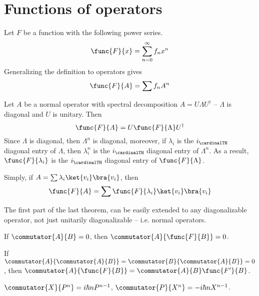 \section{Functions of operators}
Let \(F\) be a function with the following power series. 
\begin{equation*}
    \func{F}{x} = \sum_{n = 0}^{\infty} f_n x^n
\end{equation*}
Generalizing the definition to operators gives 
\begin{equation*}
    \func{F}{A} = \sum f_n A^n
\end{equation*}
\begin{theorem}
    Let \(A\) be a normal operator with spectral decomposition \(A = U \Lambda U^{\dagger}\) -- \(\Lambda\) is diagonal and \(U\) is unitary. Then 
    \begin{equation*}
        \func{F}{A} = U \func{F}{\Lambda} U^{\dagger}
    \end{equation*}
    Since \(\Lambda\) is diagonal, then \(\Lambda^n\) is diagonal, moreover, if \(\lambda_i\) is the \(i_{\cardinalTH}\) diagonal entry of \(\Lambda\), then \(\lambda_i^n\) is the \(i_{\cardinalTH}\) diagonal entry of \(\Lambda^n\). As a result, \(\func{F}{\lambda_i}\) is the \(i_{\cardinalTH}\) diagonal entry of \(\func{F}{\Lambda}\). 
    
    Simply, if \(A = \sum \lambda_i \ket{v_i}\bra{v_i}\), then 
    \begin{equation*}
        \func{F}{A} = \sum \func{F}{\lambda_i} \ket{v_i}\bra{v_i}
    \end{equation*}
\end{theorem}
The first part of the last theorem, can be easily extended to any diagonalizable operator, not just unitarily diagonalizable -- i.e. normal operators.
\begin{proposition}
    If \(\commutator{A}{B} = 0\), then \(\commutator{A}{\func{F}{B}} = 0\).
\end{proposition}
\begin{proposition}
    If \(\commutator{A}{\commutator{A}{B}} = \commutator{B}{\commutator{A}{B}} = 0\), then \(\commutator{A}{\func{F}{B}} = \commutator{A}{B} \func{F'}{B}\).
\end{proposition}
\begin{example}
    \(\commutator{X}{P^n} = i \hbar n P^{n-1}\), \(\commutator{P}{X^n} = -i\hbar n X^{n-1}\).
\end{example}
